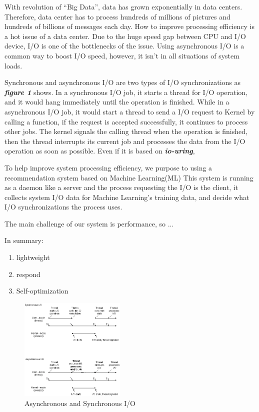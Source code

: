 \documentclass[conference]{IEEEtran}
\begin{document}
With revolution of “Big Data”, data has grown exponentially in data centers. 
Therefore, data center has to process hundreds of millions of pictures and hundreds of billions of messages each day.
How to improve processing efficiency is a hot issue of a data center. 
Due to the huge speed gap between CPU and I/O device, I/O is one of the bottlenecks of the issue.
Using asynchronous I/O is a common way to boost I/O speed, however, it isn't in all situations of system loads. 

Synchronous and asynchronous I/O are two types of I/O synchronizations as  \emph{\textbf{\large{figure 1}}} shows. 
In a synchronous I/O job, it starts a thread for I/O operation, and it would hang immediately until the operation is finished.
While in a asynchronous I/O job, it would start a thread to send a I/O request to Kernel by calling a function, if the request is accepted successfully, it continues to process other jobs. 
The kernel signals the calling thread when the operation is finished, then the thread interrupts its current job and processes the data from the I/O operation as soon as possible.
Even if it is based on \emph{\textbf{io-uring}},

To help improve system processing efficiency, we purpose to using a recommendation system based on Machine Learning(ML)
This system is running as a daemon like a server and the process requesting the I/O is the client, it collects system I/O data for Machine Learning's training data,
and decide what I/O synchronizations the process uses.

The main challenge of our system is performance, so ...

In summary:
\begin{enumerate}
    \item lightweight
    \item respond 
    \item Self-optimization
\end{enumerate}


\begin{figure}[htbp]
        \centering
        \includegraphics[width=0.45\textwidth]{fig2bedit.png}
        \caption{Asynchronous and Synchronous I/O}
\end{figure}
\end{document}
